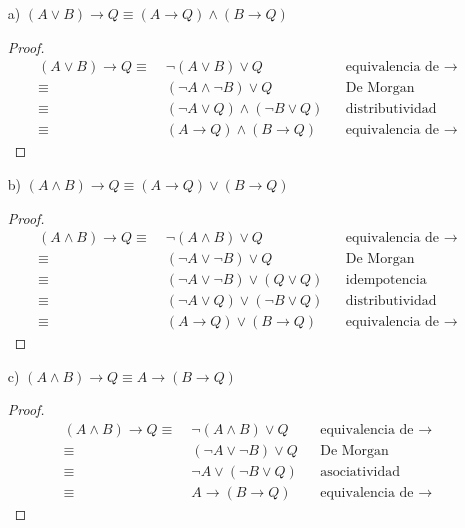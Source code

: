 \documentclass[letterpaper,11pt]{article}
\begin{document}
\begin{enumerate}
    \begin{itemize}
        \item[a)] $(A \lor B) → Q ≡ (A → Q) \land (B → Q)$ 
        \begin{proof}
            \begin{align*}
                (A \lor B) → Q 
                ≡& \; \neg (A \lor B) \lor Q  
                && \text{equivalencia de $→$} \\
                ≡& \; (\neg A \land \neg B) \lor Q 
                && \text{De Morgan} \\ 
                ≡& \; (\neg A \lor Q) \land (\neg B \lor Q)
                && \text{distributividad} \\ 
                ≡& \; (A → Q) \land (B → Q)
                && \text{equivalencia de $→$} 
            \end{align*}
        \end{proof}

        \item[b)] $(A \land B) → Q ≡ (A → Q) \lor (B → Q)$ 
        \begin{proof}
            \begin{align*}
                (A \land B) → Q 
                ≡& \; \neg (A \land B) \lor Q
                && \text{equivalencia de $→$} \\ 
                ≡& \; (\neg A \lor \neg B) \lor Q
                && \text{De Morgan} \\
                ≡& \; (\neg A \lor \neg B) \lor (Q \lor Q)
                && \text{idempotencia} \\ 
                ≡& \; (\neg A \lor Q) \lor (\neg B \lor Q)
                && \text{distributividad} \\
                ≡& \; (A → Q) \lor (B → Q)
                && \text{equivalencia de $→$}
            \end{align*}
        \end{proof}

        \item[c)] $(A \land B) → Q ≡ A → (B → Q)$
        \begin{proof}
            \begin{align*}
                (A \land B) → Q 
                ≡& \; \neg (A \land B) \lor Q
                && \text{equivalencia de $→$} \\ 
                ≡& \; (\neg A \lor \neg B) \lor Q
                && \text{De Morgan} \\ 
                ≡& \; \neg A \lor (\neg B \lor Q)
                && \text{asociatividad} \\ 
                ≡& \; A → (B → Q)
                && \text{equivalencia de $→$}
            \end{align*}
        \end{proof}
    \end{itemize}


\end{enumerate}
\end{document}
